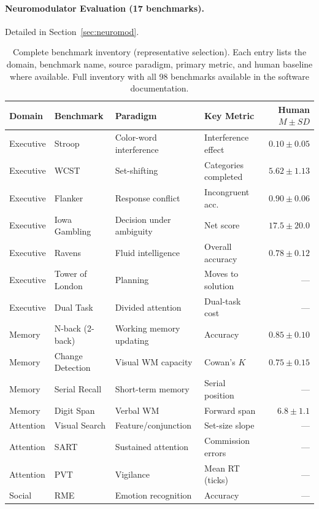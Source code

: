 \documentclass[11pt,letterpaper]{article}
\begin{document}
\paragraph{Neuromodulator Evaluation (17 benchmarks).} Detailed in Section~\ref{sec:neuromod}.

\begin{table}[p]
\centering
\caption{Complete benchmark inventory (representative selection). Each entry lists the domain, benchmark name, source paradigm, primary metric, and human baseline where available. Full inventory with all 98 benchmarks available in the software documentation.}
\label{tab:inventory}
\small
\begin{tabular}{@{}llllr@{}}
\toprule
\textbf{Domain} & \textbf{Benchmark} & \textbf{Paradigm} & \textbf{Key Metric} & \textbf{Human $M \pm SD$} \\
\midrule
Executive & Stroop & Color-word interference & Interference effect & $0.10 \pm 0.05$ \\
Executive & WCST & Set-shifting & Categories completed & $5.62 \pm 1.13$ \\
Executive & Flanker & Response conflict & Incongruent acc. & $0.90 \pm 0.06$ \\
Executive & Iowa Gambling & Decision under ambiguity & Net score & $17.5 \pm 20.0$ \\
Executive & Ravens & Fluid intelligence & Overall accuracy & $0.78 \pm 0.12$ \\
Executive & Tower of London & Planning & Moves to solution & --- \\
Executive & Dual Task & Divided attention & Dual-task cost & --- \\
\midrule
Memory & N-back (2-back) & Working memory updating & Accuracy & $0.85 \pm 0.10$ \\
Memory & Change Detection & Visual WM capacity & Cowan's $K$ & $0.75 \pm 0.15$ \\
Memory & Serial Recall & Short-term memory & Serial position & --- \\
Memory & Digit Span & Verbal WM & Forward span & $6.8 \pm 1.1$ \\
\midrule
Attention & Visual Search & Feature/conjunction & Set-size slope & --- \\
Attention & SART & Sustained attention & Commission errors & --- \\
Attention & PVT & Vigilance & Mean RT (ticks) & --- \\
\midrule
Social & RME & Emotion recognition & Accuracy & --- \\

\end{tabular}
\end{table}
\end{document}
